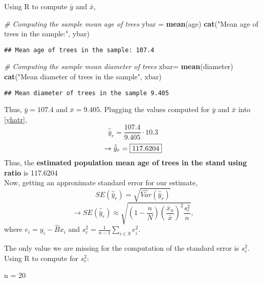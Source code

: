 \documentclass[]{article}
\newenvironment{Shaded}{\begin{snugshade}}{\end{snugshade}}
\newcommand{\CommentTok}[1]{\textcolor[rgb]{0.56,0.35,0.01}{\textit{#1}}}
\newcommand{\DecValTok}[1]{\textcolor[rgb]{0.00,0.00,0.81}{#1}}
\newcommand{\FunctionTok}[1]{\textcolor[rgb]{0.13,0.29,0.53}{\textbf{#1}}}
\newcommand{\NormalTok}[1]{#1}
\newcommand{\OtherTok}[1]{\textcolor[rgb]{0.56,0.35,0.01}{#1}}
\newcommand{\StringTok}[1]{\textcolor[rgb]{0.31,0.60,0.02}{#1}}
\begin{document}
\begin{enumerate}[label=(\alph*)]
Using R to compute $\bar y$ and $\bar x$,

\begin{Shaded}
\begin{Highlighting}[]
\CommentTok{\# Computing the sample mean age of trees}
\NormalTok{ybar }\OtherTok{=} \FunctionTok{mean}\NormalTok{(age)}
\FunctionTok{cat}\NormalTok{(}\StringTok{"Mean age of trees in the sample:"}\NormalTok{, ybar)}
\end{Highlighting}
\end{Shaded}

\begin{verbatim}
## Mean age of trees in the sample: 107.4
\end{verbatim}

\begin{Shaded}
\begin{Highlighting}[]
\CommentTok{\# Computing the sample mean diameter of trees}
\NormalTok{xbar}\OtherTok{=} \FunctionTok{mean}\NormalTok{(diameter)}
\FunctionTok{cat}\NormalTok{(}\StringTok{"Mean diameter of trees in the sample"}\NormalTok{, xbar)}
\end{Highlighting}
\end{Shaded}

\begin{verbatim}
## Mean diameter of trees in the sample 9.405
\end{verbatim}

Thus, $\bar y = 107.4$ and $\bar x = 9.405$.
Plugging the values computed for $\bar y$ and $\bar x$ into \eqref{yhatr}, 
\[
\hat{\bar y}_r = \frac{107.4}{9.405}\cdot 10.3
\]
\[
\rightarrow \hat {\bar y}_r = \fbox{117.6204}
\]
Thus, the \textbf{estimated population mean age of trees in the stand using ratio} is 117.6204 \\

Now, getting an approximate standard error for our estimate, 
\[
SE( \hat{\bar y}_r) = \sqrt{\hat{Var}({\hat{\bar y}_r})}
\]
\[
\rightarrow SE( \hat{\bar y}_r) \approx \sqrt{\left(1-\frac{n}{N}\right)\left(\frac{\bar x_u}{\bar x}\right)^2\frac{s_e^2}{n}}, \tag{2} \label{se}
\]
where $e_i = y_i - \hat Bx_i$ and $s_e^2 = \frac{1}{n-1}\sum_{i \in S}e_i^2$.

The only value we are missing for the computation of the standard error is $s_e^2$. Using R to compute for $s_e^2$:


\begin{Shaded}
\begin{Highlighting}[]
\NormalTok{n }\OtherTok{=} \DecValTok{20}


\end{Highlighting}
\end{Shaded}
\end{enumerate}
\end{document}
